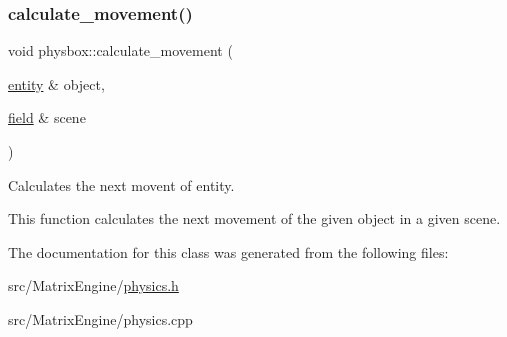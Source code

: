 \subsubsection{\texorpdfstring{calculate\+\_\+movement()}{calculate\_movement()}}
{\footnotesize\ttfamily void physbox\+::calculate\+\_\+movement (\begin{DoxyParamCaption}\item[{\hyperlink{classentity}{entity} \&}]{object,  }\item[{\hyperlink{classfield}{field} \&}]{scene }\end{DoxyParamCaption})}



Calculates the next movent of entity. 

This function calculates the next movement of the given object in a given scene. 

The documentation for this class was generated from the following files\+:\begin{DoxyCompactItemize}
\item 
src/\+Matrix\+Engine/\hyperlink{physics_8h}{physics.\+h}\item 
src/\+Matrix\+Engine/physics.\+cpp\end{DoxyCompactItemize}
